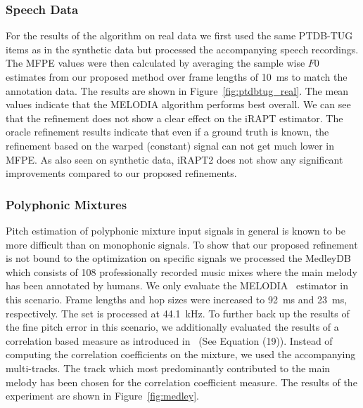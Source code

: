 \vspace{-0.6em}
\subsubsection{Speech Data} %
\label{ssub:speech}
For the results of the algorithm on real data we first used the same PTDB-TUG items as in the synthetic data but processed the accompanying speech recordings. The MFPE values were then calculated by averaging the sample wise $F0$ estimates from our proposed method over frame lengths of 10~ms to match the annotation data. The results are shown in Figure~\ref{fig:ptdbtug_real}. The mean values indicate that the MELODIA algorithm performs best overall. We can see that the refinement does not show a clear effect on the iRAPT estimator. The oracle refinement results indicate that even if a ground truth is known, the refinement based on the warped (constant) signal can not get much lower in MFPE. As also seen on synthetic data, iRAPT2 does not show any significant improvements compared to our proposed refinements.

\vspace{-0.6em}
\subsubsection{Polyphonic Mixtures} %
\label{ssub:polyphonic}

Pitch estimation of polyphonic mixture input signals in general is known to be more difficult than on monophonic signals. To show that our proposed refinement is not bound to the optimization on specific signals we processed the \mbox{MedleyDB}~\cite{MedleyDB} which consists of 108 professionally recorded music mixes where the main melody has been annotated by humans. We only evaluate the MELODIA~\cite{salamon14} estimator in this scenario. Frame lengths and hop sizes were increased to 92~ms and 23~ms, respectively. The set is processed at 44.1~kHz. To further back up the results of the fine pitch error in this scenario, we additionally evaluated the results of a correlation based measure as introduced in~\cite{resch07} (See Equation (19)). Instead of computing the correlation coefficients on the mixture, we used the accompanying multi-tracks. The track which most predominantly contributed to the main melody has been chosen for the correlation coefficient measure. The results of the experiment are shown in Figure~\ref{fig:medley}.

